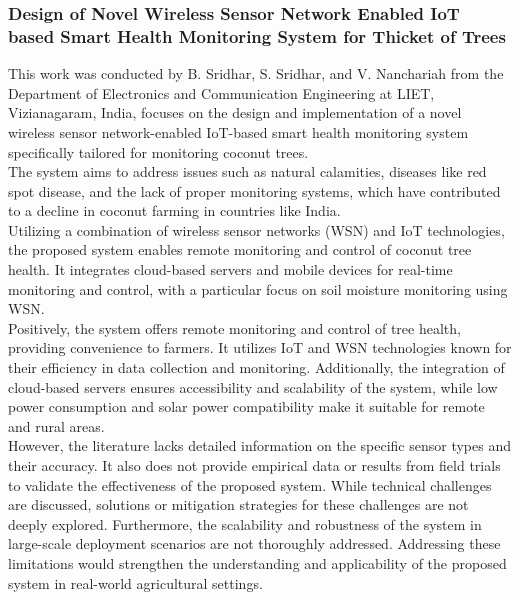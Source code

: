 \documentclass[12pt, a4paper]{article}
\begin{document}
\subsubsection{Design of Novel Wireless Sensor Network Enabled IoT based Smart Health Monitoring System for Thicket of Trees}
This work was conducted by B. Sridhar, S. Sridhar, and V. Nanchariah \cite{sridhar2020design} from the Department of Electronics and Communication Engineering at LIET, Vizianagaram, India, focuses on the design and implementation of a novel wireless sensor network-enabled IoT-based smart health monitoring system specifically tailored for monitoring coconut trees.\\
The system aims to address issues such as natural calamities, diseases like red spot disease, and the lack of proper monitoring systems, which have contributed to a decline in coconut farming in countries like India.\\
Utilizing a combination of wireless sensor networks (WSN) and IoT technologies, the proposed system enables remote monitoring and control of coconut tree health. It integrates cloud-based servers and mobile devices for real-time monitoring and control, with a particular focus on soil moisture monitoring using WSN.\\
Positively, the system offers remote monitoring and control of tree health, providing convenience to farmers. It utilizes IoT and WSN technologies known for their efficiency in data collection and monitoring. Additionally, the integration of cloud-based servers ensures accessibility and scalability of the system, while low power consumption and solar power compatibility make it suitable for remote and rural areas.\\
However, the literature lacks detailed information on the specific sensor types and their accuracy. It also does not provide empirical data or results from field trials to validate the effectiveness of the proposed system. While technical challenges are discussed, solutions or mitigation strategies for these challenges are not deeply explored. Furthermore, the scalability and robustness of the system in large-scale deployment scenarios are not thoroughly addressed. Addressing these limitations would strengthen the understanding and applicability of the proposed system in real-world agricultural settings.
\end{document}
